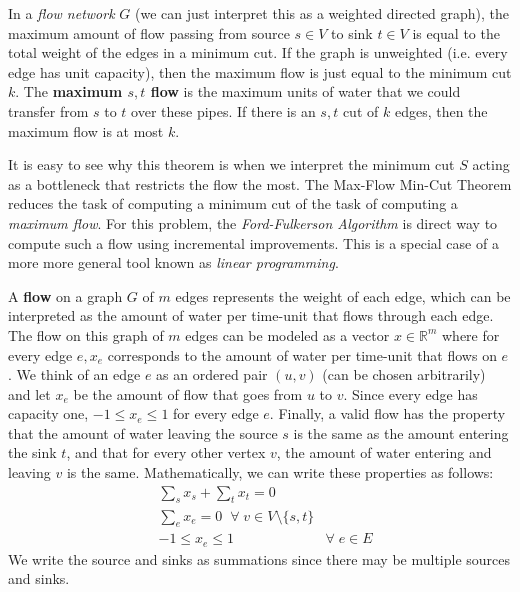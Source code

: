 \documentclass{article}
\begin{document}
  \begin{theorem}
  In a \textit{flow network} $G$ (we can just interpret this as a weighted directed graph), the maximum amount of flow passing from source $s \in V$ to sink $t \in V$ is equal to the total weight of the edges in a minimum cut. If the graph is unweighted (i.e. every edge has unit capacity), then the maximum flow is just equal to the minimum cut $k$. The \textbf{maximum $s, t$ flow} is the maximum units of water that we could transfer from $s$ to $t$ over these pipes. If there is an $s, t$ cut of $k$ edges, then the maximum flow is at most $k$. 
  \end{theorem}

  It is easy to see why this theorem is when we interpret the minimum cut $S$ acting as a bottleneck that restricts the flow the most. The Max-Flow Min-Cut Theorem reduces the task of computing a minimum cut of the task of computing a \textit{maximum flow}. For this problem, the \textit{Ford-Fulkerson Algorithm} is direct way to compute such a flow using incremental improvements. This is a special case of a more more general tool known as \textit{linear programming}. 

  \begin{definition}
  A \textbf{flow} on a graph $G$ of $m$ edges represents the weight of each edge, which can be interpreted as the amount of water per time-unit that flows through each edge. The flow on this graph of $m$ edges can be modeled as a vector $x \in \mathbb{R}^m$ where for every edge $e, x_e$ corresponds to the amount of water per time-unit that flows on $e$. We think of an edge $e$ as an ordered pair $(u, v)$ (can be chosen arbitrarily) and let $x_e$ be the amount of flow that goes from $u$ to $v$. Since every edge has capacity one, $-1 \leq x_e \leq 1$ for every edge $e$. Finally, a valid flow has the property that the amount of water leaving the source $s$ is the same as the amount entering the sink $t$, and that for every other vertex $v$, the amount of water entering and leaving $v$ is the same. Mathematically, we can write these properties as follows:  
  \begin{align*}
      & \sum_{s} x_s + \sum_t x_t = 0 \\
      & \sum_e x_e = 0 \;\; \forall\; v \in V \setminus \{s, t\} \\
      & -1 \leq x_e \leq 1 & \forall\; e \in E
  \end{align*}
  We write the source and sinks as summations since there may be multiple sources and sinks. 
  \end{definition} 
\end{document}
